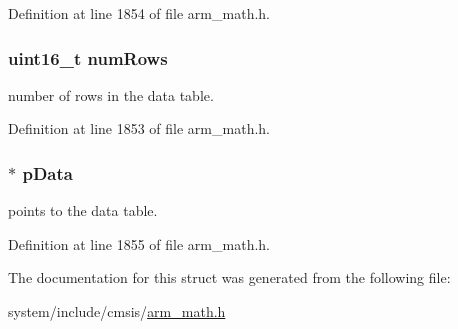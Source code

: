 Definition at line 1854 of file arm\+\_\+math.\+h.

\subsubsection[{\texorpdfstring{num\+Rows}{numRows}}]{\setlength{\rightskip}{0pt plus 5cm}uint16\+\_\+t num\+Rows}\hypertarget{structarm__bilinear__interp__instance__f32_a1bcf80ccdc2acc29198f1592ae300390}{}\label{structarm__bilinear__interp__instance__f32_a1bcf80ccdc2acc29198f1592ae300390}
number of rows in the data table. 

Definition at line 1853 of file arm\+\_\+math.\+h.

\subsubsection[{\texorpdfstring{p\+Data}{pData}}]{$\ast$ p\+Data}\hypertarget{structarm__bilinear__interp__instance__f32_af5c3a2f15c98850cdcfbe6f87e5ac5df}{}\label{structarm__bilinear__interp__instance__f32_af5c3a2f15c98850cdcfbe6f87e5ac5df}
points to the data table. 

Definition at line 1855 of file arm\+\_\+math.\+h.



The documentation for this struct was generated from the following file\+:\begin{DoxyCompactItemize}
\item 
system/include/cmsis/\hyperlink{arm__math_8h}{arm\+\_\+math.\+h}\end{DoxyCompactItemize}
